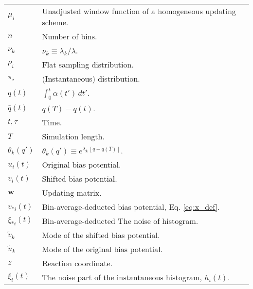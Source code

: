 \documentclass[reprint, superscriptaddress, floatfix]{revtex4-1}
\begin{document}
{\begin{table*}
\begin{tabular}{l | p{12cm} }
    $\mu_i$         &   Unadjusted window function of a homogeneous updating scheme. \\
    $n$             &   Number of bins. \\
    $\nu_k$         &   $\nu_k \equiv \lambda_k / \lambda$. \\
    $\rho_i$        &   Flat sampling distribution. \\
    $\pi_i$         &   (Instantaneous) distribution. \\
    $q(t)$          &   $\int_0^t \alpha(t') \, dt'$.  \\
    $\bar q(t)$     &   $q(T) - q(t)$.  \\
    $t, \tau$       &   Time. \\
    $T$             &   Simulation length. \\
    $\theta_k(q')$       &   $\theta_k(q') \equiv e^{\lambda_k \, [q - q(T)]}$. \\
    $u_i(t)$        &   Original bias potential. \\
    $v_i(t)$        &   Shifted bias potential. \\
    $\mathbf w$     &   Updating matrix. \\
    $v_{*i}(t)$     &   Bin-average-deducted bias potential, Eq. \eqref{eq:x_def}. \\
    $\xi_{*i}(t)$   &   Bin-average-deducted The noise of histogram. \\
    ${\tilde v}_k$  &   Mode of the shifted bias potential. \\
    ${\tilde u}_k$  &   Mode of the original bias potential. \\
    $z$             &   Reaction coordinate. \\
    $\xi_i(t)$    &   The noise part of the instantaneous histogram, $h_i(t)$.
  \end{tabular}
  \end{table*}
}


\end{document}
